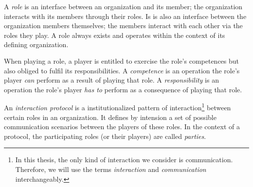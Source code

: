 A \textit{role} is an interface between an organization and its member; the organization interacts with its members through their roles.
Is is also an interface between the organization members themselves; the members interact with each other via the roles they play.
A role always exists and operates within the context of its defining organization.

When playing a role, a player is entitled to exercise the role's competences but also obliged to fulfil its responsibilities.
A \textit{competence} is an operation the role's player \textit{can} perform as a result of playing that role.
A \textit{responsibility} is an operation the role's player \textit{has to} perform as a consequence of playing that role.

An \textit{interaction protocol} is a institutionalized pattern of interaction\footnote{In this thesis, the only kind of interaction we consider is communication. Therefore, we will use the terms \textit{interaction} and \textit{communication} interchangeably.} between certain roles in an organization.
It defines by intension a set of possible communication scenarios between the players of these roles.
In the context of a protocol, the participating roles (or their players) are called \textit{parties}.